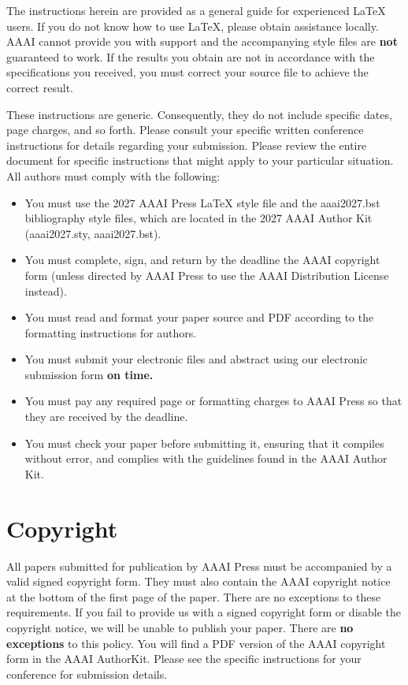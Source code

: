 \documentclass[letterpaper]{article} %
\begin{document}
The instructions herein are provided as a general guide for experienced \LaTeX{} users. If you do not know how to use \LaTeX{}, please obtain assistance locally. AAAI cannot provide you with support and the accompanying style files are \textbf{not} guaranteed to work. If the results you obtain are not in accordance with the specifications you received, you must correct your source file to achieve the correct result.

These instructions are generic. Consequently, they do not include specific dates, page charges, and so forth. Please consult your specific written conference instructions for details regarding your submission. Please review the entire document for specific instructions that might apply to your particular situation. All authors must comply with the following:

\begin{itemize}
\item You must use the 2027 AAAI Press \LaTeX{} style file and the aaai2027.bst bibliography style files, which are located in the 2027 AAAI Author Kit (aaai2027.sty, aaai2027.bst).
\item You must complete, sign, and return by the deadline the AAAI copyright form (unless directed by AAAI Press to use the AAAI Distribution License instead).
\item You must read and format your paper source and PDF according to the formatting instructions for authors.
\item You must submit your electronic files and abstract using our electronic submission form \textbf{on time.}
\item You must pay any required page or formatting charges to AAAI Press so that they are received by the deadline.
\item You must check your paper before submitting it, ensuring that it compiles without error, and complies with the guidelines found in the AAAI Author Kit.
\end{itemize}

\section{Copyright}
All papers submitted for publication by AAAI Press must be accompanied by a valid signed copyright form. They must also contain the AAAI copyright notice at the bottom of the first page of the paper. There are no exceptions to these requirements. If you fail to provide us with a signed copyright form or disable the copyright notice, we will be unable to publish your paper. There are \textbf{no exceptions} to this policy. You will find a PDF version of the AAAI copyright form in the AAAI AuthorKit. Please see the specific instructions for your conference for submission details.
\end{document}
